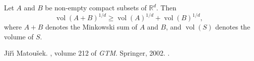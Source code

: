 \documentclass[12pt]{article}
\DeclareMathOperator{\vol}{vol}
\begin{document}
Let $A$ and $B$ be non-empty compact subsets of $\mathbb{R}^d$.
Then
\begin{equation*}
\vol(A+B)^{1/d}\geq\vol(A)^{1/d}+\vol(B)^{1/d},
\end{equation*}
where $A+B$ denotes the Minkowski sum of $A$ and $B$, and $\vol(S)$ denotes the volume of $S$.

\begin{thebibliography}{1}

Ji{\v{r}}{\'\i} Matou{\v{s}}ek.
, volume 212 of {\em GTM}.
\newblock Springer, 2002.
\newblock {}.

\end{thebibliography}

\end{document}
